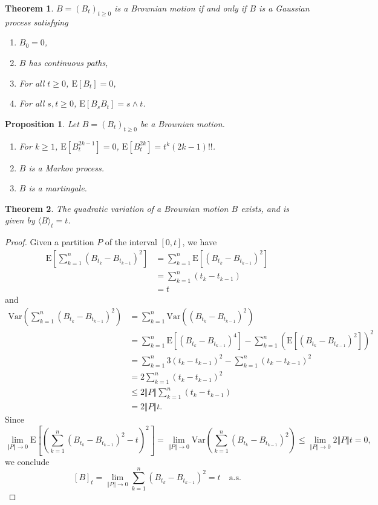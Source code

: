 \documentclass{report}
\newtheorem{proposition}{Proposition}[section]
\newtheorem{theorem}{Theorem}[section]
\theoremstyle{nonumberplain}
\newtheorem{proof}{Proof.}
\begin{document}
\begin{theorem}
	$B=(B_t)_{t\ge0}$ is a Brownian motion if and only if $B$ is a Gaussian process satisfying
	\begin{enumerate}
		\item $B_0=0$,
		\item $B$ has continuous paths,
		\item For all $t\ge0$, $\mathrm{E}[B_t]=0$,
		\item For all $s,t\ge0$, $\mathrm{E}[B_sB_t]=s\wedge t$.
	\end{enumerate}
\end{theorem}
\begin{proposition}
	Let $B=(B_t)_{t\ge0}$ be a Brownian motion.
	\begin{enumerate}
		\item For $k\ge1$, $\mathrm{E}[B_t^{2k-1}]=0$, $\mathrm{E}[B_t^{2k}]=t^{k}(2k-1)!!$.
		\item $B$ is a Markov process. 
		\item $B$ is a martingale.
	\end{enumerate}
\end{proposition}

\begin{theorem}
	The quadratic variation of a Brownian motion $B$ exists, and is given by $\langle B\rangle_{t}= t$. 
\end{theorem}
\begin{proof} 
	Given a partition $P$ of the interval $[0,t]$, we have
	\[
	\begin{aligned}
	\mathrm{E}\left[\sum _{k=1}^{n}(B_{t_{k}}-B_{t_{k-1}})^{2}\right]&=\sum _{k=1}^{n}\mathrm{E}\left[(B_{t_{k}}-B_{t_{k-1}})^{2}\right]\\
	&=\sum _{k=1}^{n}(t_{k}-t_{k-1})\\
	&=t
	\end{aligned}
	\]
	and
	\[
	\begin{aligned}
	\mathrm{Var}\left(\sum _{k=1}^{n}(B_{t_{k}}-B_{t_{k-1}})^{2}\right)&=\sum _{k=1}^{n}\mathrm{Var}\left((B_{t_{k}}-B_{t_{k-1}})^{2}\right)\\
	&=\sum _{k=1}^{n}\mathrm{E}\left[(B_{t_{k}}-B_{t_{k-1}})^{4}\right]-\sum _{k=1}^{n}\left(\mathrm{E}\left[\left(B_{t_{k}}-B_{t_{k-1}}\right)^{2}\right]\right)^{2}\\
	&=\sum_{k=1}^{n}3(t_{k}-t_{k-1})^2-\sum _{k=1}^{n}\left(t_{k}-t_{k-1}\right)^{2}\\
	&=2\sum_{k=1}^{n}(t_{k}-t_{k-1})^2\\
	&\le 2\Vert P\Vert\sum_{k=1}^{n}(t_{k}-t_{k-1})\\
	&= 2\Vert P\Vert t.
	\end{aligned}
	\]
	Since
	\[
	\lim\limits_{\Vert P\Vert\to0 }\mathrm{E}\left[\left(\sum _{k=1}^{n}(B_{t_{k}}-B_{t_{k-1}})^{2}-t\right)^2\right]=\lim\limits_{\Vert P\Vert \to0}\mathrm{Var}\left(\sum _{k=1}^{n}(B_{t_{k}}-B_{t_{k-1}})^{2}\right)\le \lim\limits_{\Vert P\Vert\to0 }2\Vert P\Vert t=0,
	\]
	we conclude 
	\[
	[B]_t=\lim_{\Vert P\Vert \rightarrow 0}\sum _{k=1}^{n}(B_{t_{k}}-B_{t_{k-1}})^{2}=t\quad\text{a.s.}
	\]
\end{proof}
\end{document}
